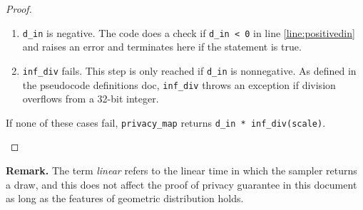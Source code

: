 \documentclass[11pt,a4paper]{article}
\newcommand{\hanwen}[1]{{ {\color{purple}{(hanwen)~#1}}}}
\begin{document}
\begin{proof}
\begin{enumerate}
 \begin{enumerate}
     \item \texttt{d\_in} is negative. The code does a check if \texttt{d\_in < 0} in line \ref{line:positivedin} and raises an error and terminates here if the statement is true. 
     \item \texttt{inf\_div} fails. This step is only reached if \texttt{d\_in} is nonnegative. As defined in the pseudocode definitions doc, \texttt{inf\_div} throws an exception if division overflows from a 32-bit integer. 
 \end{enumerate}
 
 If none of these cases fail, \texttt{privacy\_map} returns \texttt{d\_in * inf\_div(scale)}.
\end{enumerate}
\end{proof}


\noindent\textbf{Remark.}
The term \textit{linear} refers to the linear time in which the sampler returns a draw, and this does not affect
the proof of privacy guarantee in this document as
long as the features of geometric distribution holds.
\hanwen{might need different wording etc}
\end{document}
